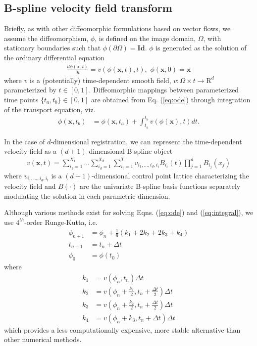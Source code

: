 \documentclass{llncs}
\begin{document}
\subsection{B-spline velocity field transform}

Briefly, as with other diffeomorphic formulations based on vector flows, we
assume the diffeomorphism, $\phi$, is defined on the image domain, $\Omega$, 
with stationary boundaries such that $\phi( \partial \Omega) = \mathbf{Id}$.
$\phi$ is generated as the solution of the ordinary differential
equation 
\begin{align}
  \label{eq:ode}
  \frac{d\phi(\mathbf{x}, t)}{dt} = v(\phi(\mathbf{x}, t), t),\,\,\phi( \mathbf{x}, 0 ) = \mathbf{x}
\end{align}
where $v$ is a (potentially) time-dependent smooth field, $v : \Omega \times t 
\rightarrow \mathrm{R}^d$ parameterized by $t \in [0,1]$.  Diffeomorphic mappings
between parameterized time points $\{t_a,t_b\} \in [0,1]$ 
are obtained from  Eq. (\ref{eq:ode}) through integration of the transport
equation, viz.
\begin{align}
  \label{eq:integral}
\phi(\mathbf{x},t_b) &= \phi(\mathbf{x},t_a) + \int_{t_a}^{t_b} v(\phi(\mathbf{x}), t) dt.
\end{align}

In the case of 
$d$-dimensional registration, we can represent the time-dependent velocity field  
as a $(d + 1)$-dimensional B-spline object
\begin{align}
v(\mathbf{x}, t) = \sum_{i_1=1}^{X_1}\ldots\sum_{i_d=1}^{X_d}\sum_{i_t=1}^T v_{i_1,\ldots,i_d,i_t} B_{i_t}(t) \prod_{j=1}^d B_{i_j}(x_j)
\end{align}
where $v_{i_1,\ldots,i_d,i_t}$ is a $(d+1)$-dimensional control point lattice
characterizing the velocity field and $B(\cdot)$ are the univariate B-spline
basis functions separately modulating the solution in each parametric dimension.

Although various methods exist for solving Eqns. (\ref{eq:ode}) and (\ref{eq:integral}),
we use $4^{th}$-order Runge-Kutta, i.e.
\begin{align}
  \phi_{n+1} &= \phi_{n} + \frac{1}{6}\left( k_1 + 2k_2 + 2k_3 + k_4 \right) \\
  t_{n+1} &= t_{n} + \Delta t \\ 
  \phi_0 &= \phi(t_0) 
\end{align}
where
\begin{align}
  k_1 &= v\left( \phi_{n}, t_{n} \right)\Delta t \\
  k_2 &= v\left( \phi_{n} + \frac{k_1}{2}, t_{n} + \frac{\Delta t}{2} \right)\Delta t \\
  k_3 &= v\left( \phi_{n} + \frac{k_2}{2}, t_{n} + \frac{\Delta t}{2} \right)\Delta t \\
  k_4 &= v\left( \phi_{n} + k_3, t_{n} + \Delta t \right)\Delta t
\end{align}  
which provides a less computationally expensive, more stable alternative than other numerical
methods.
\end{document}

